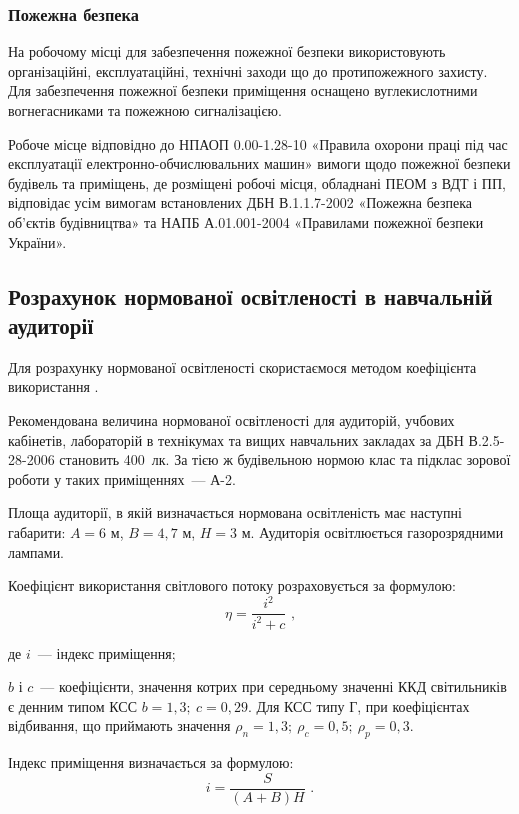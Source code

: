 \documentclass[a4paper,ukrainian,utf8,nocolumnsxix,floatsection,equationsection]{eskdtext}
\renewcommand\paragraph{\subsubsection}
\begin{document}
\paragraph{Пожежна безпека}

На робочому місці для забезпечення пожежної безпеки використовують організаційні, експлуатаційні, технічні заходи що до протипожежного захисту. Для забезпечення пожежної безпеки  приміщення оснащено вуглекислотними вогнегасниками та пожежною сигналізацією.

Робоче місце відповідно до НПАОП 0.00-1.28-10 «Правила охорони праці під час експлуатації електронно-обчислювальних машин» вимоги  щодо пожежної безпеки будівель та приміщень, де розміщені робочі місця, обладнані ПЕОМ з ВДТ і ПП, відповідає усім вимогам встановлених ДБН В.1.1.7-2002 «Пожежна безпека  об'єктів будівництва» та НАПБ А.01.001-2004 «Правилами пожежної безпеки України».

\subsection{Розрахунок нормованої освітленості в навчальній аудиторії}

Для розрахунку нормованої освітленості скористаємося методом коефіцієнта використання \cite{work:safety:18}.

Рекомендована величина нормованої освітленості для аудиторій, учбових кабінетів, лабораторій в технікумах та вищих навчальних закладах за ДБН В.2.5-28-2006 становить 400~лк. За тією ж будівельною нормою клас та підклас зорової роботи у таких приміщеннях~--- А-2.

Площа аудиторії, в якій визначається нормована освітленість має наступні габарити: $A = 6$ м, $B = 4,7$ м, $H = 3$ м. Аудиторія освітлюється газорозрядними лампами.

Коефіцієнт використання світлового потоку розраховується за формулою:
\begin{equation}
	\eta = \frac{i^2}{i^2 + c} \text{ ,}
\end{equation}

де $i$~--- індекс приміщення;

$b$ і $c$~--- коефіцієнти, значення котрих при середньому значенні ККД світильників є денним типом КСС $b=1,3;\:c = 0,29$. Для КСС типу Г, при коефіцієнтах відбивання, що приймають значення $\rho_n = 1,3;\: \rho_c=0,5;\: \rho_p=0,3$.

Індекс приміщення визначається за формулою:
\begin{equation}
	i = \frac{S}{(A + B)H} \text{ .}
\end{equation}
\end{document}
